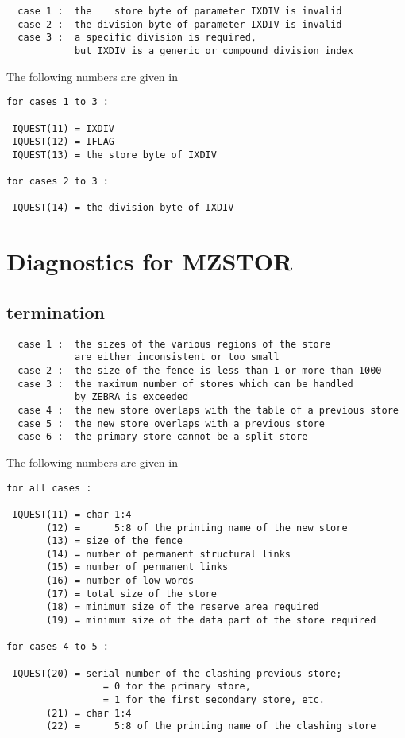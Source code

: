 \begin{verbatim}
  case 1 :  the    store byte of parameter IXDIV is invalid
  case 2 :  the division byte of parameter IXDIV is invalid
  case 3 :  a specific division is required,
            but IXDIV is a generic or compound division index
\end{verbatim}

The following numbers are given in 

\begin{verbatim}
for cases 1 to 3 :

 IQUEST(11) = IXDIV
 IQUEST(12) = IFLAG
 IQUEST(13) = the store byte of IXDIV

for cases 2 to 3 :

 IQUEST(14) = the division byte of IXDIV
\end{verbatim}

\section{Diagnostics for MZSTOR}


\subsection*{ termination}

\begin{verbatim}
  case 1 :  the sizes of the various regions of the store
            are either inconsistent or too small
  case 2 :  the size of the fence is less than 1 or more than 1000
  case 3 :  the maximum number of stores which can be handled
            by ZEBRA is exceeded
  case 4 :  the new store overlaps with the table of a previous store
  case 5 :  the new store overlaps with a previous store
  case 6 :  the primary store cannot be a split store
\end{verbatim}

The following numbers are given in 

\begin{verbatim}
for all cases :

 IQUEST(11) = char 1:4
       (12) =      5:8 of the printing name of the new store
       (13) = size of the fence
       (14) = number of permanent structural links
       (15) = number of permanent links
       (16) = number of low words
       (17) = total size of the store
       (18) = minimum size of the reserve area required
       (19) = minimum size of the data part of the store required

for cases 4 to 5 :

 IQUEST(20) = serial number of the clashing previous store;
                 = 0 for the primary store,
                 = 1 for the first secondary store, etc.
       (21) = char 1:4
       (22) =      5:8 of the printing name of the clashing store
\end{verbatim}

